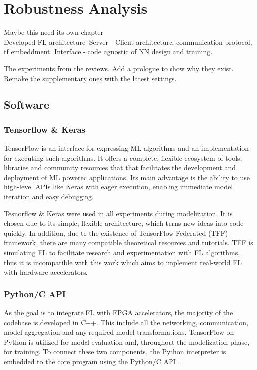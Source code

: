 \chapter{Robustness Analysis}
\label{Chapter-Robustness-Analysis}

Maybe this need its own chapter\\
Developed FL architecture. Server - Client architecture, communication protocol, tf embeddment. Interface - code agnostic of NN design and training.

The experiments from the reviews. Add a prologue to show why they exist. Remake the supplementary ones with the latest settings.

\section{Software}
\subsection{Tensorflow \& Keras}
TensorFlow \cite{tensorflow2015-whitepaper} is an interface for expressing ML algorithms and an implementation for executing such algorithms. It offers a complete, flexible ecosystem of tools, libraries and community resources that that facilitates the development and deployment of ML powered applications. Its main advantage is the ability to use high-level APIs like Keras with eager execution, enabling immediate model iteration and easy debugging. 

Tesnorflow \& Keras were used in all experiments during modelization. It is chosen due to its simple, flexible architecture, which turns new ideas into code quickly. In addition, due to the existence of TensorFlow Federated (TFF) \cite{tff} framework, there are many compatible theoretical resources and tutorials. TFF is simulating FL to facilitate research and experimentation with FL algorithms, thus it is incompatible with this work which aims to implement real-world FL with hardware accelerators.

\subsection{Python/C API} \label{Python/C API}
As the goal is to integrate FL with FPGA accelerators, the majority of the codebase is developed in C++. This include all the networking, communication, model aggregation and any required model transformations. TensorFlow on Python is utilized for model evaluation and, throughout the modelization phase, for training. To connect these two components, the Python interpreter is embedded to the core program using the Python/C API \cite{Python/C_API, embedding_python}.

